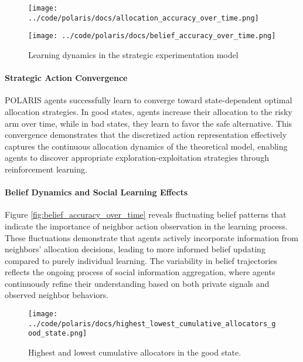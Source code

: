\begin{figure}[!htbp]
    \centering
    \begin{minipage}[t]{0.48\textwidth}
        \centering
        \texttt{[image: ../code/polaris/docs/allocation\_accuracy\_over\_time.png]}
        \label{fig:allocation_accuracy_over_time}
    \end{minipage}
    \hfill
    \begin{minipage}[t]{0.48\textwidth}
        \centering
        \texttt{[image: ../code/polaris/docs/belief\_accuracy\_over\_time.png]}
        \label{fig:belief_accuracy_over_time}
    \end{minipage}
    \caption{Learning dynamics in the strategic experimentation model}
    \label{fig:strategic_experimentation_results}
\end{figure}

\paragraph{Strategic Action Convergence} POLARIS agents successfully learn to converge toward state-dependent optimal allocation strategies. In good states, agents increase their allocation to the risky arm over time, while in bad states, they learn to favor the safe alternative. This convergence demonstrates that the discretized action representation effectively captures the continuous allocation dynamics of the theoretical model, enabling agents to discover appropriate exploration-exploitation strategies through reinforcement learning.

\paragraph{Belief Dynamics and Social Learning Effects} Figure \ref{fig:belief_accuracy_over_time} reveals fluctuating belief patterns that indicate the importance of neighbor action observation in the learning process. These fluctuations demonstrate that agents actively incorporate information from neighbors' allocation decisions, leading to more informed belief updating compared to purely individual learning. The variability in belief trajectories reflects the ongoing process of social information aggregation, where agents continuously refine their understanding based on both private signals and observed neighbor behaviors.


\begin{figure}[!htbp]
    \centering
        \texttt{[image: ../code/polaris/docs/highest\_lowest\_cumulative\_allocators\_good\_state.png]}
        \caption{Highest and lowest cumulative allocators in the good state.}
        \label{fig:highest_lowest_cumulative_allocators_good_state}
\end{figure}


